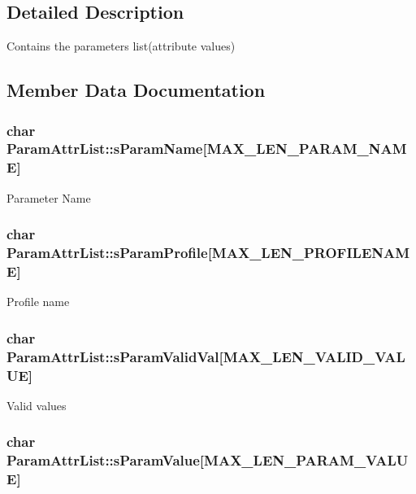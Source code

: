\subsection{Detailed Description}
Contains the parameters list(attribute values) 

\subsection{Member Data Documentation}
\hypertarget{structParamAttrList_a4f361455c9f6518e7571b7dcd37799d1}{
\subsubsection[{s\-Param\-Name}]{\setlength{\rightskip}{0pt plus 5cm}char Param\-Attr\-List\-::s\-Param\-Name\mbox{[}{\bf M\-A\-X\-\_\-\-L\-E\-N\-\_\-\-P\-A\-R\-A\-M\-\_\-\-N\-A\-M\-E}\mbox{]}}}\label{structParamAttrList_a4f361455c9f6518e7571b7dcd37799d1}
Parameter Name \hypertarget{structParamAttrList_a2053def555ac67f0e39742cdd467cec5}{
\subsubsection[{s\-Param\-Profile}]{\setlength{\rightskip}{0pt plus 5cm}char Param\-Attr\-List\-::s\-Param\-Profile\mbox{[}{\bf M\-A\-X\-\_\-\-L\-E\-N\-\_\-\-P\-R\-O\-F\-I\-L\-E\-N\-A\-M\-E}\mbox{]}}}\label{structParamAttrList_a2053def555ac67f0e39742cdd467cec5}
Profile name \hypertarget{structParamAttrList_a75dc56c3f70323a05748c59882e8203e}{
\subsubsection[{s\-Param\-Valid\-Val}]{\setlength{\rightskip}{0pt plus 5cm}char Param\-Attr\-List\-::s\-Param\-Valid\-Val\mbox{[}{\bf M\-A\-X\-\_\-\-L\-E\-N\-\_\-\-V\-A\-L\-I\-D\-\_\-\-V\-A\-L\-U\-E}\mbox{]}}}\label{structParamAttrList_a75dc56c3f70323a05748c59882e8203e}
Valid values \hypertarget{structParamAttrList_a626d8635ccd1c07d4e04a938ad880035}{
\subsubsection[{s\-Param\-Value}]{\setlength{\rightskip}{0pt plus 5cm}char Param\-Attr\-List\-::s\-Param\-Value\mbox{[}{\bf M\-A\-X\-\_\-\-L\-E\-N\-\_\-\-P\-A\-R\-A\-M\-\_\-\-V\-A\-L\-U\-E}\mbox{]}}}\label{structParamAttrList_a626d8635ccd1c07d4e04a938ad880035}
